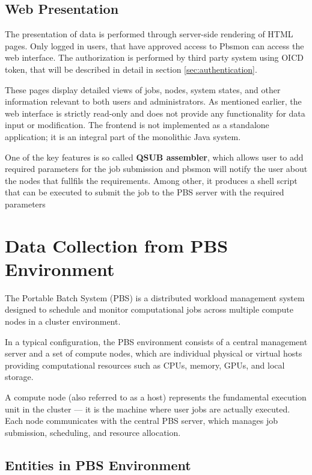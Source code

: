 \documentclass[
  digital,     %
  oneside,     %
  nosansbold,  %
  nocolorbold, %
  lof,         %
  lot,         %
]{fithesis4}
\begin{document}
\subsection{Web Presentation}
\label{subsec:web-presentation}

The presentation of data is performed through server-side rendering of HTML pages. Only logged in users, that have approved access to Pbsmon can access the web interface. The authorization is performed by third party system using OICD token, that will be described in detail in section \ref{sec:authentication}.

These pages display detailed views of jobs, nodes, system states, and other information relevant to both users and administrators. As mentioned earlier, the web interface is strictly read-only and does not provide any functionality for data input or modification.
The frontend is not implemented as a standalone application; it is an integral part of the monolithic Java system.

One of the key features is so called \textbf{QSUB assembler}, which allows user to add required parameters for the job submission and pbsmon will notify the user about the nodes that fullfils the requirements. Among other, it produces a shell script that can be executed to submit the job to the PBS server with the required parameters

\newpage
\section{Data Collection from PBS Environment}
\label{sec:data-collection-from-pbs-environment}
The Portable Batch System (PBS) is a distributed workload management system designed to schedule and monitor computational jobs across multiple compute nodes in a cluster environment. \cite{pbs2022} 

In a typical configuration, the PBS environment consists of a central management server and a set of compute nodes, which are individual physical or virtual hosts providing computational resources such as CPUs, memory, GPUs, and local storage. \cite{pbs2022} 

A compute node (also referred to as a host) represents the fundamental execution unit in the cluster — it is the machine where user jobs are actually executed. Each node communicates with the central PBS server, which manages job submission, scheduling, and resource allocation. \cite{pbs2022} 

\subsection{Entities in PBS Environment}
\label{subsec:entities-in-pbs-environment}
\end{document}
